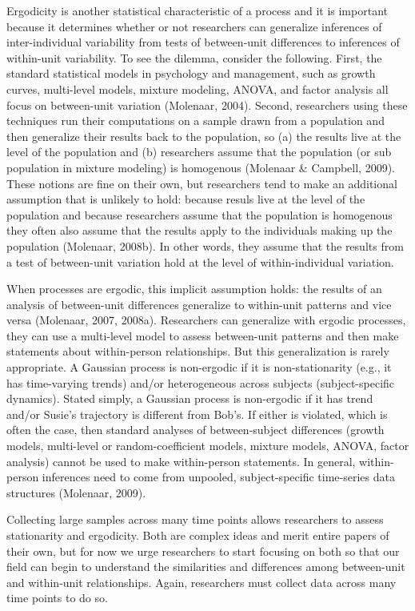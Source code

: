 \documentclass[english,,man]{apa6}
\theoremstyle{definition}
\theoremstyle{definition}
\theoremstyle{definition}
\theoremstyle{remark}
\begin{document}
Ergodicity is another statistical characteristic of a process and it is
important because it determines whether or not researchers can
generalize inferences of inter-individual variability from tests of
between-unit differences to inferences of within-unit variability. To
see the dilemma, consider the following. First, the standard statistical
models in psychology and management, such as growth curves, multi-level
models, mixture modeling, ANOVA, and factor analysis all focus on
between-unit variation (Molenaar, 2004). Second, researchers using these
techniques run their computations on a sample drawn from a population
and then generalize their results back to the population, so (a) the
results live at the level of the population and (b) researchers assume
that the population (or sub population in mixture modeling) is
homogenous (Molenaar \& Campbell, 2009). These notions are fine on their
own, but researchers tend to make an additional assumption that is
unlikely to hold: because resuls live at the level of the population and
because researchers assume that the population is homogenous they often
also assume that the results apply to the individuals making up the
population (Molenaar, 2008b). In other words, they assume that the
results from a test of between-unit variation hold at the level of
within-individual variation.

When processes are ergodic, this implicit assumption holds: the results
of an analysis of between-unit differences generalize to within-unit
patterns and vice versa (Molenaar, 2007, 2008a). Researchers can
generalize with ergodic processes, they can use a multi-level model to
assess between-unit patterns and then make statements about
within-person relationships. But this generalization is rarely
appropriate. A Gaussian process is non-ergodic if it is non-stationarity
(e.g., it has time-varying trends) and/or heterogeneous across subjects
(subject-specific dynamics). Stated simply, a Gaussian process is
non-ergodic if it has trend and/or Susie's trajectory is different from
Bob's. If either is violated, which is often the case, then standard
analyses of between-subject differences (growth models, multi-level or
random-coefficient models, mixture models, ANOVA, factor analysis)
cannot be used to make within-person statements. In general,
within-person inferences need to come from unpooled, subject-specific
time-series data structures (Molenaar, 2009).

Collecting large samples across many time points allows researchers to
assess stationarity and ergodicity. Both are complex ideas and merit
entire papers of their own, but for now we urge researchers to start
focusing on both so that our field can begin to understand the
similarities and differences among between-unit and within-unit
relationships. Again, researchers must collect data across many time
points to do so.
\end{document}
